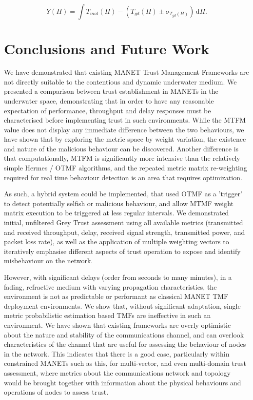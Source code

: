 \documentclass[conference]{IEEEtran}
\begin{document}
\begin{equation}
  Y(H) = \int \! T_{mal}(H) - (T_{gd}(H)\pm\sigma_{T_{gd}(H)})\, \mathrm{d}H.
  \label{eq:regression_target}
\end{equation}

\section{Conclusions and Future Work}
We have demonstrated that existing MANET Trust Management Frameworks are not directly suitable to the contentious and dynamic underwater medium.
We presented a comparison between trust establishment in MANETs in the underwater space, demonstrating that in order to have any reasonable expectation of performance, throughput and delay responses must be characterised before implementing trust in such environments. 
While the MTFM value does not display any immediate difference between the two behaviours, we have shown that by exploring the metric space by weight variation, the existence and nature of the malicious behaviour can be discovered.
Another difference is that computationally, MTFM is significantly more intensive than the relatively simple Hermes / OTMF algorithms, and the repeated metric matrix re-weighting required for real time behaviour detection is an area that requires optimization. 

As such, a hybrid system could be implemented, that used OTMF as a 'trigger' to detect potentially selfish or malicious behaviour, and allow MTMF weight matrix execution to be triggered at less regular intervals.
We demonstrated initial, unfiltered Grey Trust assessment using all available metrics (transmitted and received throughput, delay, received signal strength, transmitted power, and packet loss rate), as well as the application of multiple weighting vectors to iteratively emphasise different aspects of trust operation to expose and identify misbehaviour on the network.

However, with significant delays (order from seconds to many minutes), in a fading, refractive medium with varying propagation characteristics, the environment is not as predictable or performant as classical MANET TMF deployment environments.
We show that, without significant adaptation, single metric probabilistic estimation based TMFs are ineffective in such an environment.
We have shown that existing frameworks are overly optimistic about the nature and stability of the communications channel, and can overlook characteristics of the channel that are useful for assessing the behaviour of nodes in the network. 
This indicates that there is a good case, particularly within constrained MANETs such as this, for multi-vector, and even multi-domain trust assessment, where metrics about the communications network and topology would be brought together with information about the physical behaviours and operations of nodes to assess trust.
\end{document}
